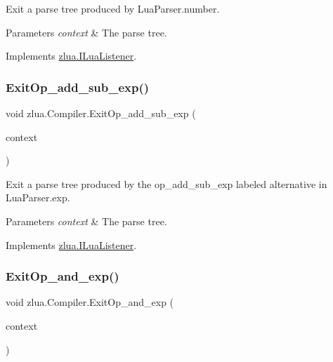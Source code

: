 Exit a parse tree produced by Lua\+Parser.\+number. 


\begin{DoxyParams}{Parameters}
{\em context} & The parse tree.\\
\hline
\end{DoxyParams}


Implements \mbox{\hyperlink{interfacezlua_1_1_i_lua_listener_a3c6fb2edc82e8e12e51ea539d512762b}{zlua.\+I\+Lua\+Listener}}.

\mbox{\label{classzlua_1_1_compiler_affc819ef0753a9871122ffe4144bffe2}} 
\subsubsection{\texorpdfstring{Exit\+Op\+\_\+add\+\_\+sub\+\_\+exp()}{ExitOp\_add\_sub\_exp()}}
{\footnotesize\ttfamily void zlua.\+Compiler.\+Exit\+Op\+\_\+add\+\_\+sub\+\_\+exp (\begin{DoxyParamCaption}\item[{\mbox{[}\+Not\+Null\mbox{]} \mbox{\hyperlink{classzlua_1_1_lua_parser_1_1_op__add__sub__exp_context}{Lua\+Parser.\+Op\+\_\+add\+\_\+sub\+\_\+exp\+Context}}}]{context }\end{DoxyParamCaption})}



Exit a parse tree produced by the {\ttfamily op\+\_\+add\+\_\+sub\+\_\+exp} labeled alternative in Lua\+Parser.\+exp. 


\begin{DoxyParams}{Parameters}
{\em context} & The parse tree.\\
\hline
\end{DoxyParams}


Implements \mbox{\hyperlink{interfacezlua_1_1_i_lua_listener_a51e9a33e0c604e3a6151becd926a5852}{zlua.\+I\+Lua\+Listener}}.

\mbox{\label{classzlua_1_1_compiler_a51cc2b5c59894178b1afdeb578997e83}} 
\subsubsection{\texorpdfstring{Exit\+Op\+\_\+and\+\_\+exp()}{ExitOp\_and\_exp()}}
{\footnotesize\ttfamily void zlua.\+Compiler.\+Exit\+Op\+\_\+and\+\_\+exp (\begin{DoxyParamCaption}\item[{\mbox{[}\+Not\+Null\mbox{]} \mbox{\hyperlink{classzlua_1_1_lua_parser_1_1_op__and__exp_context}{Lua\+Parser.\+Op\+\_\+and\+\_\+exp\+Context}}}]{context }\end{DoxyParamCaption})}



